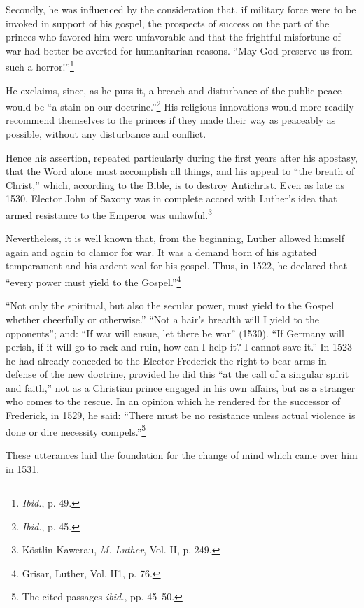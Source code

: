 Secondly, he was influenced by the consideration that, if military
force were to be invoked in support of his gospel, the prospects of
success on the part of the princes who favored him were unfavorable
and that the frightful misfortune of war had better be averted for
humanitarian reasons. “May God preserve us from such a horror!”\footnote{\textit{Ibid.}, p. 49.}

He exclaims, since, as he puts it, a breach and disturbance of the
public peace would be “a stain on our doctrine.”\footnote{\textit{Ibid.}, p. 45.}
His religious
innovations would more readily recommend themselves to the princes
if they made their way as peaceably as possible, without any disturbance
and conflict.

Hence his assertion, repeated particularly during the first years
after his apostasy, that the Word alone must accomplish all
things, and his appeal to “the breath of Christ,” which, according to
the Bible, is to destroy Antichrist. Even as late as 1530, Elector John
of Saxony was in complete accord with Luther’s idea that armed resistance
to the Emperor was unlawful.\footnote{Köstlin-Kawerau, \textit{M. Luther}, Vol. II, p. 249.}

Nevertheless, it is well known that, from the beginning, Luther
allowed himself again and again to clamor for war. It was a demand
born of his agitated temperament and his ardent zeal for his gospel.
Thus, in 1522, he declared that “every power must yield to the Gospel.”\footnote{Grisar, Luther, Vol. II1, p. 76.}

“Not only the spiritual, but also the secular power, must yield
to the Gospel whether cheerfully or otherwise.” “Not a hair’s breadth
will I yield to the opponents”; and: “If war will ensue, let there be
war” (1530). “If Germany will perish, if it will go to rack and
ruin, how can I help it? I cannot save it.” In 1523 he had already
conceded to the Elector Frederick the right to bear arms in defense
of the new doctrine, provided he did this “at the call of a singular
spirit and faith,” not as a Christian prince engaged in his own affairs,
but as a stranger who comes to the rescue. In an opinion which he rendered
for the successor of Frederick, in 1529, he said: “There must be
no resistance unless actual violence is done or dire necessity compels.”\footnote{The cited passages \textit{ibid.}, pp. 45--50.}

These utterances laid the foundation for the change of mind which
came over him in 1531.

